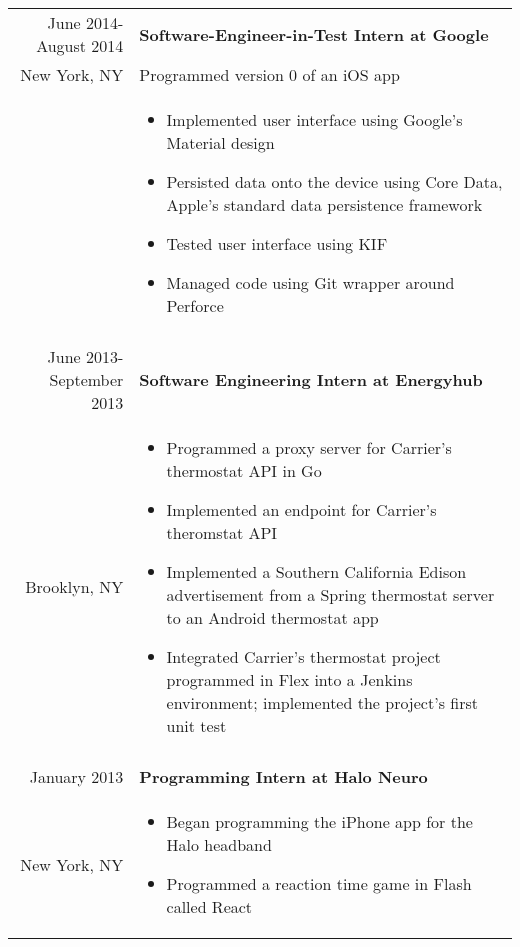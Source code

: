 \documentclass[letterpaper,10pt]{article} %
\begin{document}
\begin{longtable}{r|p{4.5in}}
    June 2014-August 2014 & \textbf{Software-Engineer-in-Test Intern at Google} \\
    New York, NY & Programmed version 0 of an iOS app \\
    & \begin{itemize}
        \item Implemented user interface using Google's Material design
        \item Persisted data onto the device using Core Data, Apple's standard data persistence framework
        \item Tested user interface using KIF
        \item Managed code using Git wrapper around Perforce
    \end{itemize} \\

    \multicolumn{2}{c}{} \\

    June 2013-September 2013 & \textbf{Software Engineering Intern at Energyhub} \\
    Brooklyn, NY & \begin{itemize}
        \item Programmed a proxy server for Carrier's thermostat API in Go
        \item Implemented an endpoint for Carrier's theromstat API
        \item
            Implemented a Southern California Edison advertisement from a Spring thermostat server
            to an Android thermostat app
        \item
            Integrated Carrier’s thermostat project programmed in Flex into a Jenkins environment;
            implemented the project’s first unit test
    \end{itemize} \\

    \multicolumn{2}{c}{} \\

    January 2013 & \textbf{Programming Intern at Halo Neuro} \\
    New York, NY & \begin{itemize}
        \item Began programming the iPhone app for the Halo headband
        \item Programmed a reaction time game in Flash called React
    \end{itemize} \\


\end{longtable}
\end{document}
